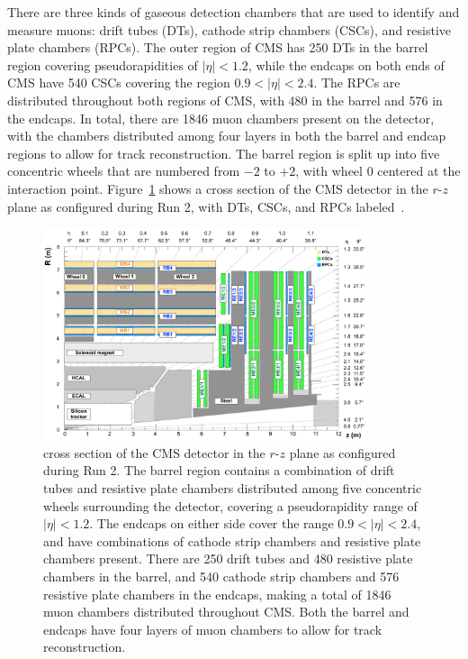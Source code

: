 There are three kinds of gaseous detection chambers that are used to identify and measure muons: drift tubes (DTs), cathode strip chambers (CSCs), and resistive plate chambers (RPCs).
The outer region of CMS has 250 DTs in the barrel region covering pseudorapidities of $|\eta|<1.2$, while the endcaps on both ends of CMS have 540 CSCs covering the region $0.9<|\eta|<2.4$.
The RPCs are distributed throughout both regions of CMS, with 480 in the barrel and 576 in the endcaps.
In total, there are 1846 muon chambers present on the detector, with the chambers distributed among four layers in both the barrel and endcap regions to allow for track reconstruction. %
The barrel region is split up into five concentric wheels that are numbered from $-2$ to $+2$, with wheel 0 centered at the interaction point.
Figure~\ref{fig:CMScrosssec} shows a cross section of the CMS detector in the $r$-$z$ plane as configured during Run 2, with DTs, CSCs, and RPCs labeled~\cite{Sirunyan_2018_CMS}.

\begin{figure}[htbp]
  \centering
  \includegraphics[width=0.85\textwidth]{fig/experiment/cms_crosssec.pdf}
  \caption{
    cross section of the CMS detector in the $r$-$z$ plane as configured during Run 2.
    The barrel region contains a combination of drift tubes and resistive plate chambers distributed among five concentric wheels surrounding the detector, covering a pseudorapidity range of $|\eta|<1.2$.
    The endcaps on either side cover the range $0.9<|\eta|<2.4$, and have combinations of cathode strip chambers and resistive plate chambers present.
    There are 250 drift tubes and 480 resistive plate chambers in the barrel, and 540 cathode strip chambers and 576 resistive plate chambers in the endcaps, making a total of 1846 muon chambers distributed throughout CMS.
    Both the barrel and endcaps have four layers of muon chambers to allow for track reconstruction.
  }
  \label{fig:CMScrosssec}
\end{figure}

